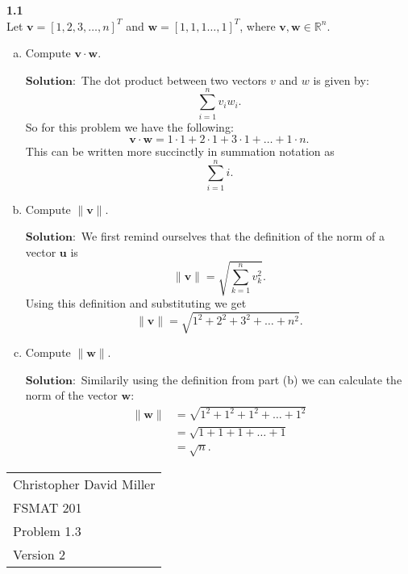 \documentclass[12pt]{article}
\begin{document}
    \vspace{20pt}  %
    
    
    \textbf{1.1} \\  
    
        Let $\mathbf{v} = [1,2,3,\dots ,n]^T$ and $\mathbf{w} = [1,1,1\dots,1]^T$, where $\mathbf{v},\mathbf{w} \in \mathbb{R}^n$.
    
    
    \begin{enumerate}[(a)]
        \item Compute $\mathbf{v} \cdot \mathbf{w}$.
        
            $\textbf{Solution}:$ The dot product between two vectors $v$ and $w$ is given by:\[
              \sum_{i=1}^n v_iw_i  
            .\]
            So for this problem we have the following:
            \[
            \mathbf{v} \cdot \mathbf{w} = 1\cdot1 + 2 \cdot 1 + 3 \cdot 1 + \dots + 1 \cdot n
            .\]
            This can be written more succinctly in summation notation as
            \[
            \sum_{i=1}^n i
            .\]
        \item Compute $\|\mathbf{v}\|$.        
        
            $\textbf{Solution}:$ We first remind ourselves that the definition of the norm of a vector $\mathbf{u}$ is \[
                \|  \mathbf{v} \| = \sqrt{\sum_{k=1}^{n}v_k^2}
            .\]
            Using this definition and substituting we get\[
                \|  \mathbf{v} \| = \sqrt{1^2 + 2^2 + 3^2 + \dots +n^2}
            .\]
        \item Compute $\|\mathbf{w}\|$.
                
        $\textbf{Solution}:$ Similarily using the definition from part (b) we can calculate the norm of the vector $\mathbf{w}$:
        \begin{align*}
            \|  \mathbf{w} \|& = \sqrt{1^2 + 1^2 + 1^2 + \dots +1^2}\\
            & = \sqrt{1 + 1 + 1 + \dots +1}\\
            & = \sqrt{n}
        .\end{align*}
       
    \end{enumerate}

\newpage
\begin{flushright}
    \begin{tabular}{l}
    Christopher David Miller \\  %
    FSMAT 201 \\  %
    Problem 1.3 \\  %
    Version 2 \\ %
    \end{tabular}
    \end{flushright}
    \vspace{20pt}  %
    
\end{document}
